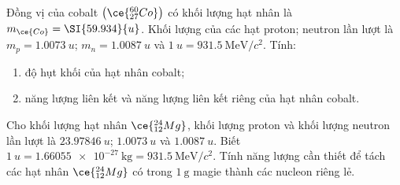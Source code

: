 \begin{vd}
Đồng vị của cobalt $\left(\ce{^{60}_{27}Co}\right)$ có khối lượng hạt nhân là $m_{\ce{Co}}=\SI{59.934}{u}$. Khối lượng của các hạt proton; neutron lần lượt là $m_p=\SI{1.0073}{u}$; $m_n=\SI{1.0087}{u}$ và $\SI{1}{u}=\SI{931.5}{\mega\electronvolt/c^2}$. Tính:
\begin{enumerate}[label=\alph*)]
	\item độ hụt khối của hạt nhân cobalt;
	\item năng lượng liên kết và năng lượng liên kết riêng của hạt nhân cobalt.
\end{enumerate}
\end{vd}
\begin{vd}
	Cho khối lượng hạt nhân $\ce{^{24}_{12} Mg}$, khối lượng proton và khối lượng neutron lần lượt là $\SI{23.97846}{u}$; $\SI{1.0073}{u}$ và $\SI{1.0087}{u}$. Biết $\SI{1}{u}=\SI{1.66055e-27}{\kilogram}=\SI{931.5}{\mega\electronvolt/c^2}$. Tính năng lượng cần thiết để tách các hạt nhân $\ce{^{24}_{12} Mg}$ có trong $\SI{1}{\gram}$ magie thành các nucleon riêng lẻ.
\end{vd}
